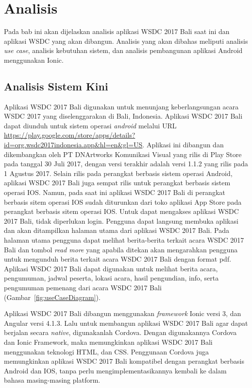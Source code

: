 \chapter{Analisis}
\label{chap:analisis}

Pada bab ini akan dijelaskan analisis aplikasi WSDC 2017 Bali saat ini dan aplikasi WSDC yang akan dibangun. Analisis yang akan dibahas meliputi analisis {\it use case}, analisis kebutuhan sistem, dan analisis pembangunan aplikasi Android menggunakan Ionic.

\section{Analisis Sistem Kini}
\label{sec:analisisSistemKini}
Aplikasi WSDC 2017 Bali digunakan untuk menunjang keberlangsungan acara WSDC 2017 yang diselenggarakan di Bali, Indonesia. Aplikasi WSDC 2017 Bali dapat diunduh untuk sistem operasi {\it android} melalui URL \url{https://play.google.com/store/apps/details?id=org.wsdc2017indonesia.app&hl=en&gl=US}. Aplikasi ini dibangun dan dikembangkan oleh PT DNArtworks Komunikasi Visual yang rilis di Play Store pada tanggal 30 Juli 2017, dengan versi terakhir adalah versi 1.1.2 yang rilis pada 1 Agustus 2017. Selain rilis pada perangkat berbasis sistem operasi Android, aplikasi WSDC 2017 Bali juga sempat rilis untuk perangkat berbasis sistem operasi IOS. Namun, pada saat ini aplikasi WSDC 2017 Bali di perangkat berbasis sitem operasi IOS sudah diturunkan dari toko aplikasi App Store pada perangkat berbasis sitem operasi IOS. Untuk dapat mengakses aplikasi WSDC 2017 Bali, tidak diperlukan login. Pengguna dapat langsung membuka aplikasi dan akan ditampilkan halaman utama dari aplikasi WSDC 2017 Bali. Pada halaman utama pengguna dapat melihat berita-berita terkait acara WSDC 2017 Bali dan tombol {\it read more} yang apabila ditekan akan mengarahkan pengguna untuk mengunduh berita terkait acara WSDC 2017 Bali dengan format pdf. Aplikasi WSDC 2017 Bali dapat digunakan untuk melihat berita acara, pengumuman, jadwal peserta, lokasi acara, hasil pengundian, info, serta pengumuman pemenang dari acara WSDC 2017 Bali (Gambar~\ref{fig:useCaseDiagram}).

Aplikasi WSDC 2017 Bali dibangun menggunakan {\it framework} Ionic versi 3, dan Angular versi 4.1.3. Lalu untuk membangun aplikasi WSDC 2017 Bali agar dapat berjalan secara {\it native}, digunakanlah Cordova. Dengan digunakannya Cordova dan Ionic Framework, maka memungkinkan aplikasi WSDC 2017 Bali menggunakan teknologi HTML, dan CSS. Penggunaan Cordova juga memungkinkan aplikasi WSDC 2017 Bali kompatibel dengan perangkat berbasis Android dan IOS, tanpa perlu mengimplementasikannya kembali ke dalam bahasa masing-masing platform.

